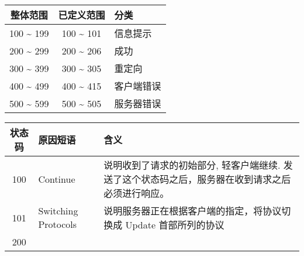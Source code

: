 \begin{longtable}[]{@{}ccl@{}}
\toprule
整体范围 & 已定义范围 & 分类\tabularnewline
\midrule
\endhead
100 \textasciitilde{} 199 & 100 \textasciitilde{} 101 &
信息提示\tabularnewline
200 \textasciitilde{} 299 & 200 \textasciitilde{} 206 &
成功\tabularnewline
300 \textasciitilde{} 399 & 300 \textasciitilde{} 305 &
重定向\tabularnewline
400 \textasciitilde{} 499 & 400 \textasciitilde{} 415 &
客户端错误\tabularnewline
500 \textasciitilde{} 599 & 500 \textasciitilde{} 505 &
服务器错误\tabularnewline
\bottomrule
\end{longtable}

\begin{longtable}[]{@{}cll@{}}
\toprule
\begin{minipage}[b]{0.32\columnwidth}\centering\strut
状态码\strut
\end{minipage} & \begin{minipage}[b]{0.30\columnwidth}\raggedright\strut
原因短语\strut
\end{minipage} & \begin{minipage}[b]{0.30\columnwidth}\raggedright\strut
含义\strut
\end{minipage}\tabularnewline
\midrule
\endhead
\begin{minipage}[t]{0.32\columnwidth}\centering\strut
100\strut
\end{minipage} & \begin{minipage}[t]{0.30\columnwidth}\raggedright\strut
Continue\strut
\end{minipage} & \begin{minipage}[t]{0.30\columnwidth}\raggedright\strut
说明收到了请求的初始部分, 轻客户端继续.
发送了这个状态码之后，服务器在收到请求之后必须进行响应。\strut
\end{minipage}\tabularnewline
\begin{minipage}[t]{0.32\columnwidth}\centering\strut
101\strut
\end{minipage} & \begin{minipage}[t]{0.30\columnwidth}\raggedright\strut
Switching Protocols\strut
\end{minipage} & \begin{minipage}[t]{0.30\columnwidth}\raggedright\strut
说明服务器正在根据客户端的指定，将协议切换成 Update 首部所列的协议\strut
\end{minipage}\tabularnewline
\begin{minipage}[t]{0.32\columnwidth}\centering\strut
200\strut
\end{minipage} & \begin{minipage}[t]{0.30\columnwidth}\raggedright\strut

\end{minipage}
\end{longtable}
